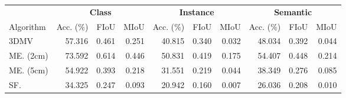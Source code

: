 \begin{tabular}{lrrrrrrrrr}
\toprule
 &  \multicolumn{3}{c}{\textbf{Class}}&  \multicolumn{3}{c}{\textbf{Instance}}&  \multicolumn{3}{c}{\textbf{Semantic}} \\
Algorithm &  Acc. (\%) &  FIoU &  MIoU&  Acc. (\%) &  FIoU &  MIoU&  Acc. (\%) &  FIoU &  MIoU \\
\midrule
3DMV              &        57.316 & 0.461 & 0.251&        40.815 & 0.340 & 0.032&        48.034 & 0.392 & 0.044 \\
ME. (2cm) &        73.592 & 0.614 & 0.446&        50.831 & 0.419 & 0.175&        54.407 & 0.448 & 0.214 \\
ME. (5cm) &        54.922 & 0.393 & 0.218&        31.551 & 0.219 & 0.044&        38.349 & 0.276 & 0.085 \\
SF.    &        34.325 & 0.247 & 0.093&        20.942 & 0.160 & 0.007&        26.036 & 0.208 & 0.010 \\
\bottomrule
\end{tabular}
